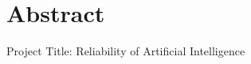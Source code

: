 \thispagestyle{plain}
\pagebreak
\chapter*{Abstract}
Project Title: Reliability of Artificial Intelligence\\
